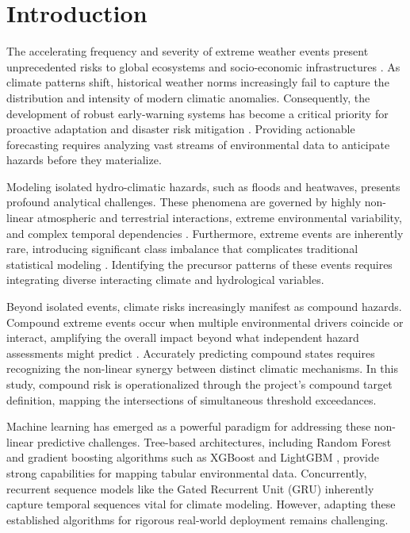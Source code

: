 \section{Introduction}
\label{sec:intro}

The accelerating frequency and severity of extreme weather events present unprecedented risks to global ecosystems and socio-economic infrastructures \cite{IPCC2021}. As climate patterns shift, historical weather norms increasingly fail to capture the distribution and intensity of modern climatic anomalies. Consequently, the development of robust early-warning systems has become a critical priority for proactive adaptation and disaster risk mitigation \cite{Zscheischler2018}. Providing actionable forecasting requires analyzing vast streams of environmental data to anticipate hazards before they materialize.

Modeling isolated hydro-climatic hazards, such as floods and heatwaves, presents profound analytical challenges. These phenomena are governed by highly non-linear atmospheric and terrestrial interactions, extreme environmental variability, and complex temporal dependencies \cite{Mosavi2018}. Furthermore, extreme events are inherently rare, introducing significant class imbalance that complicates traditional statistical modeling \cite{He2009}. Identifying the precursor patterns of these events requires integrating diverse interacting climate and hydrological variables.

Beyond isolated events, climate risks increasingly manifest as compound hazards. Compound extreme events occur when multiple environmental drivers coincide or interact, amplifying the overall impact beyond what independent hazard assessments might predict \cite{Zscheischler2020}. Accurately predicting compound states requires recognizing the non-linear synergy between distinct climatic mechanisms. In this study, compound risk is operationalized through the project's compound target definition, mapping the intersections of simultaneous threshold exceedances.

Machine learning has emerged as a powerful paradigm for addressing these non-linear predictive challenges. Tree-based architectures, including Random Forest \cite{Breiman2001} and gradient boosting algorithms such as XGBoost \cite{Chen2016} and LightGBM \cite{Ke2017}, provide strong capabilities for mapping tabular environmental data. Concurrently, recurrent sequence models like the Gated Recurrent Unit (GRU) \cite{Cho2014} inherently capture temporal sequences vital for climate modeling. However, adapting these established algorithms for rigorous real-world deployment remains challenging.

